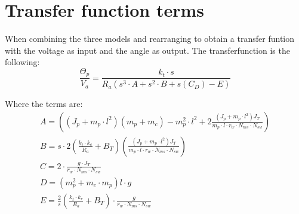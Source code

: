 \section{Transfer function terms}
When combining the three models and rearranging to obtain a transfer funtion with the voltage as input and the angle as output. 
The transferfunction is the following:
\begin{equation}
\frac{\Theta_p}{V_a}=\frac{k_t\cdot s}{R_a(s^3\cdot A + s^2 \cdot B + s(C_D)-E)}
\end{equation}

Where the terms are:
\begin{align}
A=((J_p+m_p\cdot l^2)(m_p+m_c)-m_p^2\cdot l^2 + 2\frac{(J_p+m_p\cdot l^2)J_T}{m_p\cdot l\cdot r_w \cdot N_{ms}\cdot N_{sw}})\\
B=s\cdot 2(\frac{k_t\cdot k_e}{R_a}+B_T)(\frac{(J_p+m_p\cdot l^2)J_T}{m_p\cdot l\cdot r_w \cdot N_{ms}\cdot N_{sw}})\\
C=2\cdot \frac{g\cdot J_T}{r_w\cdot N_{ms}\cdot N_{sw}}\\
D=(m_p^2+m_c\cdot m_p)l\cdot g\\
E=\frac{2}{s}(\frac{k_t\cdot k_e}{R_a}+B_T)\cdot \frac{g}{r_w\cdot N_{ms}\cdot N_{sw}}
\end{align}